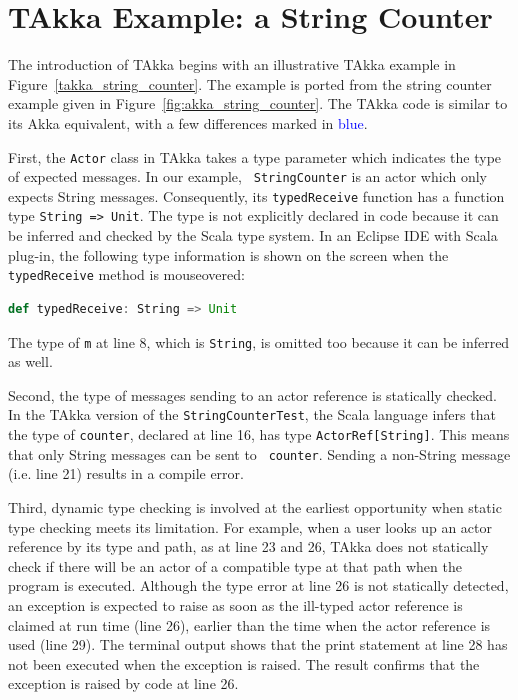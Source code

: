 \section{TAkka Example: a String Counter}
\label{sec:takka_example}

The introduction of TAkka begins with an illustrative TAkka example in Figure~\ref{takka_string_counter}. The example is ported from the string counter 
example given in Figure~\ref{fig:akka_string_counter}.  The TAkka code is 
similar to its Akka equivalent, with a few differences marked in 
\textcolor{blue}{blue}.  

First, the {\tt Actor} class in TAkka takes a type 
parameter which indicates the type of expected messages.  In our example, {\tt 
StringCounter} is an actor which only expects String messages.  Consequently, 
its {\tt typedReceive} function has a function type {\tt String => Unit}.  The 
type is not explicitly declared in code because it can be inferred and checked 
by the Scala type system.  In an Eclipse IDE with Scala plug-in, the following 
type information is shown on the screen when the {\tt typedReceive} 
method is mouseovered:
\begin{lstlisting}[language=scala]
  def typedReceive: String => Unit
\end{lstlisting}%
The type of {\tt m} at line 8, which is {\tt String}, is omitted too because it can be 
inferred as well.

Second, the type of messages sending to an actor reference is statically 
checked. In the TAkka version of the {\tt StringCounterTest}, the Scala 
language infers that the  type of {\tt counter}, declared at line 16, has type 
{\tt ActorRef[String]}.  This means that only String messages can be sent to {\tt 
counter}.   Sending a non-String message (i.e. line 21) results in a compile error.

Third, dynamic type checking is involved at the earliest opportunity when 
static type checking meets its limitation.  For example, when a user looks up 
an actor reference by its type and path, as at line 23 and 26, 
TAkka does not statically check if there will be an actor of a 
compatible type at that path when the program is executed.  Although the type 
error at line 26 is not statically detected, an exception is expected to raise
as soon as the ill-typed actor reference is claimed at run time (line 26), 
earlier than the time when the actor reference is used (line 29).  
The terminal output shows that the print statement
at line 28 has not been executed when the exception is raised.  The result confirms that
the exception is raised by code at line 26.



